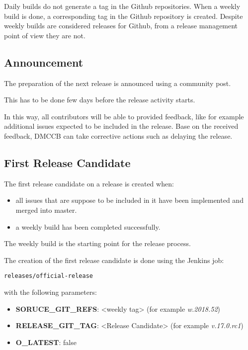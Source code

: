Daily builds do not generate a tag in the Github repositories. 
When a weekly build is done, a corresponding tag in the Github repository is created.
Despite weekly builds are considered releases for Github, from a release management point of view they are not.

 
\subsection{Announcement} \label{sect:anaouncement}

The preparation of the next release is announced using a community post.

This has to be done few days before the release activity starts.

In this way, all contributors will be able to provided feedback, like for example additional issues expected to be included in the release.
Base on the received feedback, DMCCB can take corrective actions such as delaying the release.


\subsection{First Release Candidate} \label{sect:firstrc}

The first release candidate on a release is created when:

\begin{itemize}
\item all issues that are suppose to be included in it have been implemented and merged into master.
\item a weekly build has been completed successfully.
\end{itemize}

The weekly build is the starting point for the release process.

The creation of the first release candidate is done using the Jenkins job:

\begin{verbatim}
releases/official-release 
\end{verbatim}

with the following parameters:

\begin{itemize}
\item {\bf SORUCE\_GIT\_REFS}: <weekly tag> (for example \textit{w.2018.52})
\item {\bf RELEASE\_GIT\_TAG}: <Release Candidate> (for example \textit{v.17.0.rc1})
\item {\bf O\_LATEST}: false
\end{itemize}


